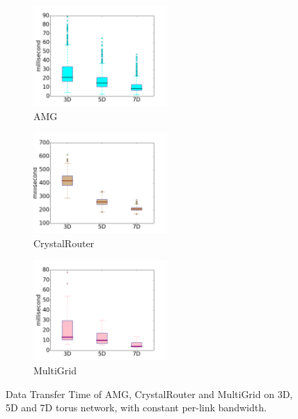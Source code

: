 \documentclass[conference]{IEEEtran}
\begin{document}
\begin{figure}[t!]
    \centering
    \begin{subfigure}[t]{0.32\textwidth}
        \centering
        \includegraphics[height=1.5in]{figs/dimenstudy/amg_box}
        \caption{AMG}
        \label{fig:dimen-amg}
    \end{subfigure}%
    \hspace{1em}%
    \begin{subfigure}[t]{0.32\textwidth}
        \centering
        \includegraphics[height=1.5in]{figs/dimenstudy/cr_box}
        \caption{CrystalRouter}
        \label{fig:dimen-cr}
    \end{subfigure}%
    \begin{subfigure}[t]{0.32\textwidth}
        \centering
        \includegraphics[height=1.5in]{figs/dimenstudy/mg_box}
        \caption{MultiGrid}
        \label{fig:dimen-mg}
    \end{subfigure}%
   \caption{Data Transfer Time of AMG, CrystalRouter and MultiGrid on 3D, 5D and 7D torus network, with constant per-link bandwidth.}
   \label{fig:dimensionality-study}
\end{figure}
\end{document}
